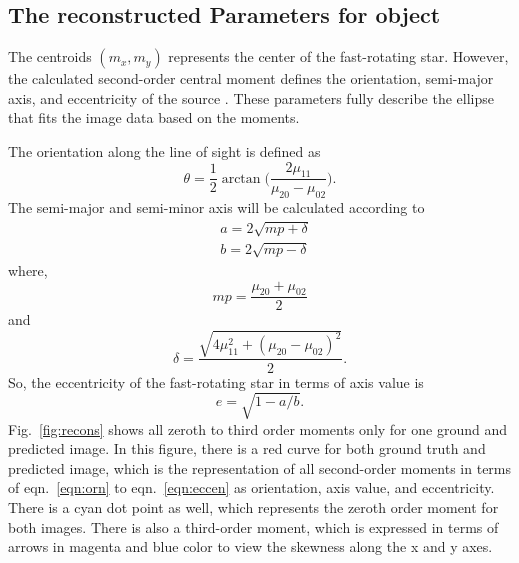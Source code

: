 \subsection{The reconstructed Parameters for object}
The centroids $(m_x, m_y)$ represents the center of the fast-rotating star. However, the calculated second-order central moment defines the orientation, semi-major axis, and eccentricity of the source \citep{teague1980image}. These parameters fully describe the ellipse that fits the image data based on the moments. 

The orientation along the line of sight is defined as
\begin{equation}
	\theta = \frac{1}{2}\arctan \big(\frac{2\mu_{11}}{\mu_{20} - \mu_{02}}\big).
	\label{eqn:orn}
\end{equation}
The semi-major and semi-minor axis will be calculated according to
\begin{equation}
	\begin{aligned}
		&a = 2\sqrt{mp + \delta} \\
		&b = 2\sqrt{mp - \delta}
	\end{aligned}
	\label{eqn:semi}
\end{equation}
where,
\begin{equation}
	mp = \frac{\mu_{20} + \mu_{02}}{2}
	\label{eqn:mp}
\end{equation}
and
\begin{equation}
	\delta = \frac{\sqrt{4\mu_{11}^2 + (\mu_{20} - \mu_{02})^2}}{2}.	
	\label{eqn:delta}
\end{equation}
So, the eccentricity of the fast-rotating star in terms of axis value is 
\begin{equation}
	e = \sqrt{1 - a/b}.
	\label{eqn:eccen}
\end{equation}
Fig.~\ref{fig:recons} shows all zeroth to third order moments only for one ground and predicted image. In this figure, there is a red curve for both ground truth and predicted image, which is the representation of all second-order moments in terms of eqn.~\ref{eqn:orn} to eqn.~\ref{eqn:eccen} as orientation, axis value, and eccentricity. There is a cyan dot point as well, which represents the zeroth order moment for both images. There is also a third-order moment, which is expressed in terms of arrows in magenta and blue color to view the skewness along the x and y axes.